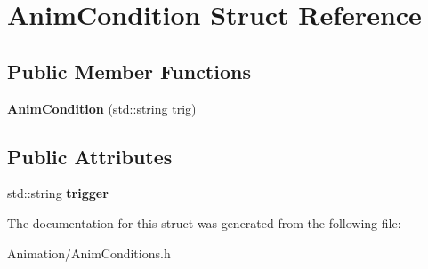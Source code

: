 \hypertarget{structAnimCondition}{}\section{Anim\+Condition Struct Reference}
\label{structAnimCondition}
\subsection*{Public Member Functions}
\begin{DoxyCompactItemize}
\item 
\mbox{\label{structAnimCondition_a9a2af25ab2ec40a4b38a463d7158b0e5}} 
{\bfseries Anim\+Condition} (std\+::string trig)
\end{DoxyCompactItemize}
\subsection*{Public Attributes}
\begin{DoxyCompactItemize}
\item 
\mbox{\label{structAnimCondition_a19376bf645ad7e17a9dc49dbb113c065}} 
std\+::string {\bfseries trigger}
\end{DoxyCompactItemize}


The documentation for this struct was generated from the following file\+:\begin{DoxyCompactItemize}
\item 
Animation/Anim\+Conditions.\+h\end{DoxyCompactItemize}
